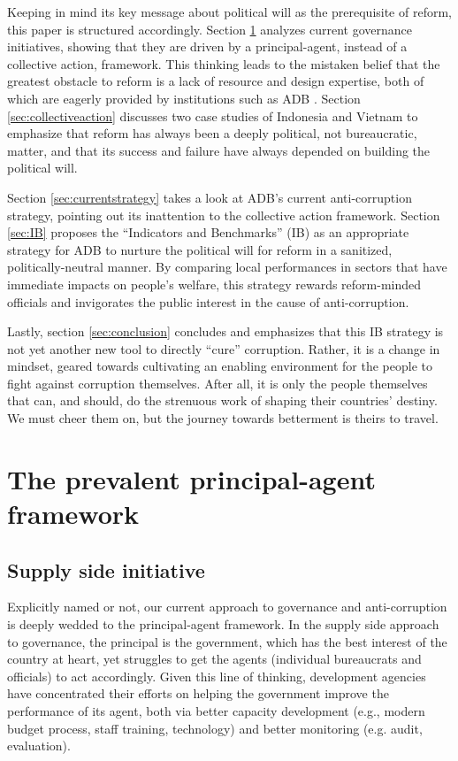 \documentclass[12pt]{article}
\begin{document}
Keeping in mind its key message about political will as the prerequisite of reform, this paper is structured accordingly. Section \ref{sec:principalagent} analyzes current governance initiatives, showing that they are driven by a principal-agent, instead of a collective action, framework. This thinking leads to the mistaken belief that the greatest obstacle to reform is a lack of resource and design expertise, both of which are eagerly provided by institutions such as ADB \citep[16]{GlobalIntegrity2012}. Section \ref{sec:collectiveaction} discusses two case studies of Indonesia and Vietnam to emphasize that reform has always been a deeply political, not bureaucratic, matter, and that its success and failure have always depended on building the political will.

Section \ref{sec:currentstrategy} takes a look at ADB's current anti-corruption strategy, pointing out its inattention to the collective action framework. Section \ref{sec:IB} proposes the ``Indicators and Benchmarks'' (IB) as an appropriate strategy for ADB to nurture the political will for reform in a sanitized, politically-neutral manner. By comparing local performances in sectors that have immediate impacts on people's welfare, this strategy rewards reform-minded officials and invigorates the public interest in the cause of anti-corruption.

Lastly, section \ref{sec:conclusion} concludes and emphasizes that this IB strategy is not yet another new tool to directly ``cure'' corruption. Rather, it is a change in mindset, geared towards cultivating an enabling environment for the people to fight against corruption themselves. After all, it is only the people themselves that can, and should, do the strenuous work of shaping their countries' destiny. We must cheer them on, but the journey towards betterment is theirs to travel.

\section{The prevalent principal-agent framework} \label{sec:principalagent}

\subsection{Supply side initiative} \label{sec:supplyside}
Explicitly named or not, our current approach to governance and anti-corruption is deeply wedded to the principal-agent framework. In the supply side approach to governance, the principal is the government, which has the best interest of the country at heart, yet struggles to get the agents (individual bureaucrats and officials) to act accordingly. Given this line of thinking, development agencies have concentrated their efforts on helping the government improve the performance of its agent, both via better capacity development (e.g., modern budget process, staff training, technology) and better monitoring  (e.g. audit, evaluation).
\end{document}
